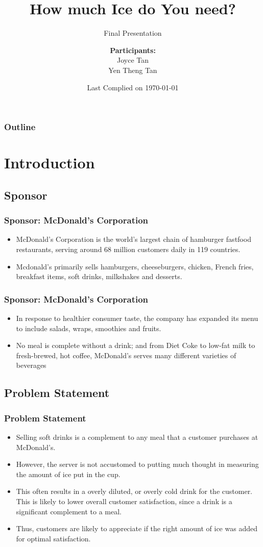 \documentclass[compress,handout,10pt]{beamer}
\title{{\color{blue} \LARGE How much Ice do You need?\newline} }
\subtitle{{\color{red} \large Final Presentation} }
\author{ 
    {\bf{Participants:}} \\ 
Joyce Tan \\ 
Yen Theng Tan \\
    \vspace{5pt}
}
\institute{JHU AMS 2012 FALL}
\date{\mygreen Last Complied on \today}
\let\olditem\item
\renewcommand{\item}{\setlength{\itemsep}{0.5\baselineskip}\olditem}
\begin{document}
\begin{frame}[plain]
    \titlepage
\end{frame}


\begin{frame}
    \frametitle{Outline}
      \tableofcontents
\end{frame}

\section{Introduction}
\subsection{Sponsor}
\begin{frame}
    \frametitle{Sponsor: McDonald's Corporation}
    \begin{itemize}
     \item McDonald's Corporation is the world's largest chain of hamburger fastfood restaurants, serving around 68 million customers daily in 119 countries.
\item Mcdonald's primarily sells hamburgers, cheeseburgers, chicken, French fries, breakfast items, soft drinks, milkshakes and desserts. 
    \end{itemize}
\end{frame}

\begin{frame}
    \frametitle{Sponsor: McDonald's Corporation}
    \begin{itemize}
         	\item In response to healthier consumer taste, the company has expanded its menu to include salads, wraps, smoothies and fruits.
	 \item No meal is complete without a drink; and from Diet Coke to low-fat milk to fresh-brewed, hot coffee, McDonald's serves many different varieties of beverages
    \end{itemize}
\end{frame}

\subsection{Problem Statement}
\begin{frame}
    \frametitle{Problem Statement}
     \begin{itemize}
         \item Selling soft drinks is a complement to any meal that a customer purchases at McDonald's.
\item However, the server is not accustomed to putting much thought in measuring the amount of ice put in the cup.
\item This often results in a overly diluted, or overly cold drink for the customer. This is likely to lower overall customer satisfaction, since a drink is a significant complement to a meal. 
\item Thus, customers are likely to appreciate if the right amount of ice was added for optimal satisfaction.
     \end{itemize}
\end{frame}
\end{document}
